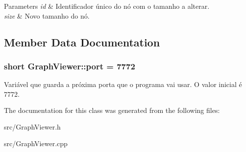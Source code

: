 \begin{DoxyParams}{Parameters}
{\em id} & Identificador único do nó com o tamanho a alterar. \\
\hline
{\em size} & Novo tamanho do nó. \\
\hline
\end{DoxyParams}


\subsection{Member Data Documentation}
\subsubsection[{\texorpdfstring{port}{port}}]{\setlength{\rightskip}{0pt plus 5cm}short Graph\+Viewer\+::port = 7772\hspace{0.3cm}{\ttfamily [static]}}\hypertarget{class_graph_viewer_a89d0abe75f41feededc49497cc514342}{}\label{class_graph_viewer_a89d0abe75f41feededc49497cc514342}
Variável que guarda a próxima porta que o programa vai usar. O valor inicial é 7772. 

The documentation for this class was generated from the following files\+:\begin{DoxyCompactItemize}
\item 
src/Graph\+Viewer.\+h\item 
src/Graph\+Viewer.\+cpp\end{DoxyCompactItemize}
